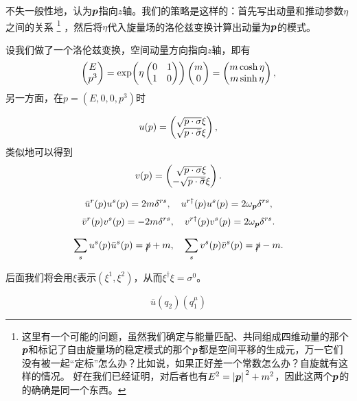 不失一般性地，认为$\vb*{p}$指向$z$轴。我们的策略是这样的：首先写出动量和推动参数$\eta$之间的关系%
\footnote{
    这里有一个可能的问题，虽然我们确定与能量匹配、共同组成四维动量的那个$\vb*{p}$和标记了自由旋量场的稳定模式的那个$\vb*{p}$都是空间平移的生成元，万一它们没有被一起“定标”怎么办？比如说，如果正好差一个常数怎么办？自旋就有这样的情况。
    好在我们已经证明，对后者也有$E^2 = \abs*{\vb*{p}}^2 + m^2$，因此这两个$\vb*{p}$的的确确是同一个东西。
}%
，然后将$\eta$代入旋量场的洛伦兹变换计算出动量为$\vb*{p}$的模式。

设我们做了一个洛伦兹变换，空间动量方向指向$z$轴，即有
\[
    \pmqty{E \\ p^3} = \exp(\eta \pmqty{0 & 1 \\ 1 & 0}) \pmqty{m \\ 0} = \pmqty{m \cosh \eta \\ m \sinh \eta},
\]
另一方面，在$p=(E, 0, 0, p^3)$时

\begin{equation}
    u(p) = \pmqty{ \sqrt{p \cdot \sigma} \xi \\ \sqrt{p \cdot \bar{\sigma}} \xi },
\end{equation}
类似地可以得到
\begin{equation}
    v(p) = \pmqty{ \sqrt{p \cdot \sigma} \xi \\ - \sqrt{p \cdot \bar{\sigma}} \xi }.
\end{equation}

\begin{equation}
    \bar{u}^r(p) u^s(p) = 2 m \delta^{rs}, \quad u^{r \dagger}(p) u^s(p) = 2 \omega_{\vb*{p}} \delta^{rs},
\end{equation}
\begin{equation}
    \bar{v}^r(p) v^s(p) = - 2 m \delta^{rs}, \quad v^{r \dagger}(p) v^s(p) = 2 \omega_{\vb*{p}} \delta^{rs}.
\end{equation}

\begin{equation}
    \sum_s u^s(p) \bar{u}^s(p) = \slashed{p} + m, \quad \sum_s v^s(p) \bar{v}^s(p) = \slashed{p} - m.
\end{equation}

后面我们将会用$\xi$表示$(\xi^1, \xi^2)$，从而$\xi^\dagger \xi = \sigma^0$。


\begin{equation}
    \bar{u}(q_2) (q_1^\mu )
\end{equation}

